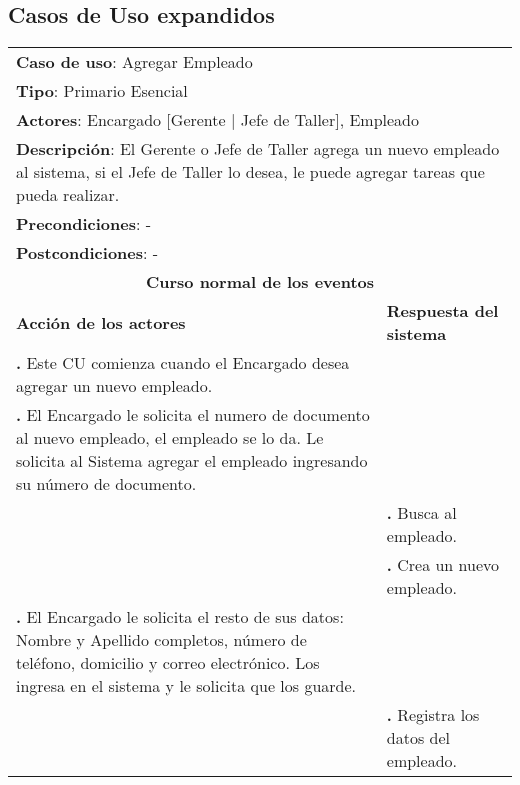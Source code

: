 \documentclass[12pt]{extarticle}
\begin{document}
    \subsection{Casos de Uso expandidos}

    \newcommand\inc{\stepcounter{step}\textbf{\thestep. }}
    \newcommand\resetinc{\setcounter{step}{0}}
    
    \newcommand\raya{\noindent\rule{169mm}{0.8mm}\\}

\begin{longtable}{ |p{8cm}|p{8cm}| }
    \hline
    \multicolumn{2}{|p{16cm}|}{\textbf{Caso de uso}: Agregar Empleado}\\
    \multicolumn{2}{|p{16cm}|}{\textbf{Tipo}: Primario Esencial}\\
    \multicolumn{2}{|p{16cm}|}{\textbf{Actores}: Encargado [Gerente | Jefe de Taller], Empleado}\\
    \multicolumn{2}{|p{16cm}|}{\textbf{Descripción}: El Gerente o Jefe de Taller agrega un nuevo empleado al sistema, si el Jefe de Taller lo desea, le puede agregar tareas que pueda realizar.}\\
    \multicolumn{2}{|p{16cm}|}{\textbf{Precondiciones}: - }\\
    \multicolumn{2}{|p{16cm}|}{\textbf{Postcondiciones}: - }\\
    \hline
    \multicolumn{2}{|c|}{\textbf{Curso normal de los eventos}}\\
    \hline
    \textbf{Acción de los actores} & \textbf{Respuesta del sistema}\\
    \hline
        \inc Este CU comienza cuando el Encargado desea agregar un nuevo empleado.& \\
        \hline
        \inc  El Encargado le solicita el numero de documento al nuevo empleado, el empleado se lo da. Le solicita al Sistema agregar el empleado ingresando su número de documento.& \\
        \hline
        & \inc  Busca al empleado.\\
        \hline
        & \inc  Crea un nuevo empleado.\\
        \hline
        \inc El Encargado le solicita el resto de sus datos: Nombre y Apellido completos, número de teléfono, domicilio y correo electrónico. Los ingresa en el sistema y le solicita que los guarde.& \\
        \hline
        & \inc Registra los datos del empleado.\\

\end{longtable}
\end{document}

